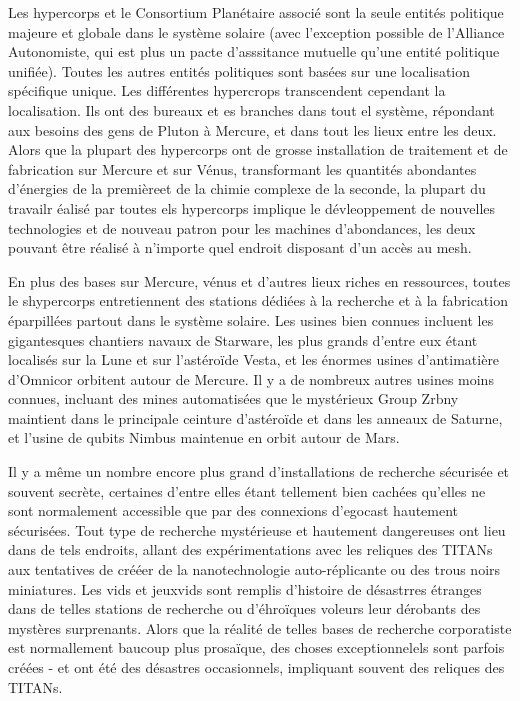                Les hypercorps et le Consortium Planétaire associé sont la seule entités politique majeure et globale dans le système solaire (avec l'exception possible de l'Alliance Autonomiste, qui est plus un pacte d'asssitance mutuelle qu'une entité politique unifiée). Toutes les autres entités politiques sont basées sur une localisation spécifique unique. Les différentes hypercrops transcendent cependant la localisation. Ils ont des bureaux et es branches dans tout el système, répondant aux besoins des gens de Pluton à Mercure, et dans tout les lieux entre les deux. Alors que la plupart des hypercorps ont de grosse installation de traitement et de fabrication sur Mercure et sur Vénus, transformant les quantités abondantes d'énergies de la premièreet de la chimie complexe de la seconde, la plupart du travailr éalisé par toutes els hypercorps implique le dévleoppement de nouvelles technologies et de nouveau patron pour les machines d'abondances, les deux pouvant être réalisé à n'importe quel endroit disposant d'un accès au mesh. 

               En plus des bases sur Mercure, vénus et d'autres lieux riches en ressources, toutes le shypercorps entretiennent des stations dédiées à la recherche et à la fabrication éparpillées partout dans le système solaire. Les usines bien connues incluent les gigantesques chantiers navaux de Starware, les plus grands d'entre eux étant localisés sur la Lune et sur l'astéroïde Vesta, et les énormes usines d'antimatière d'Omnicor orbitent autour de Mercure. Il y a de nombreux autres usines moins connues, incluant des mines automatisées que le mystérieux Group Zrbny maintient dans le principale ceinture d'astéroïde et dans les anneaux de Saturne, et l'usine de qubits Nimbus maintenue en orbit autour de Mars. 

               Il y a même un nombre encore plus grand d'installations de recherche sécurisée et souvent secrète, certaines d'entre elles étant tellement bien cachées qu'elles ne sont normalement accessible que par des connexions d'egocast hautement sécurisées. Tout type de recherche mystérieuse et hautement dangereuses ont lieu dans de tels endroits, allant des expérimentations avec les reliques des TITANs aux tentatives de crééer de la nanotechnologie auto-réplicante ou des trous noirs miniatures. Les vids et jeuxvids sont remplis d'histoire de désastrres étranges dans de telles stations de recherche ou d'éhroïques voleurs leur dérobants des mystères surprenants. Alors que la réalité de telles bases de recherche corporatiste est normallement baucoup plus prosaïque, des choses exceptionnelels sont parfois créées - et ont été des désastres occasionnels, impliquant souvent des reliques des TITANs. 

